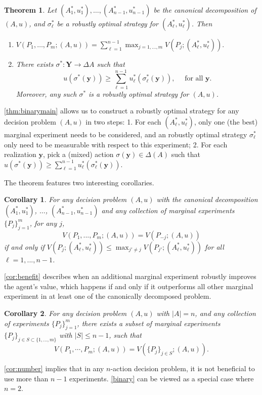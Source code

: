 \documentclass[11pt]{article}
\theoremstyle{plain}
\newtheorem{thm}{Theorem}
\newtheorem{cor}{Corollary}
\theoremstyle{remark}
\begin{document}
\begin{thm}\label{thm:binarymain}
Let $(A_1^*, u_1^*), \ldots , (A_{n-1}^*, u_{n-1}^*)$ be the canonical decomposition of $(A, u)$, and $\sigma^*_\ell$ be a robustly optimal strategy for $(A_{\ell}^*,u^*_\ell)$.   Then
\begin{enumerate}
    \item $V(P_1, \ldots , P_m; (A,u)) = \sum_{\ell = 1}^{n-1} \max_{j = 1, \ldots , m} V(P_j; (A_\ell^*, u_\ell^*)).$
    \item There exists $\sigma^*:\mathbf{Y}\rightarrow \Delta A$ such that
\[u(\sigma^*(\mathbf{y}))\geq \sum_{\ell=1}^{n-1} u^*_\ell(\sigma_\ell^*(\mathbf{y})),\quad\text{ for all }\mathbf{y}.\]
Moreover, any such $\sigma^*$ is a robustly optimal strategy for $(A,u)$.
\end{enumerate}
\end{thm}

\autoref{thm:binarymain} allows us to construct a robustly optimal strategy for any decision problem $(A,u)$ in two steps: 1. For each $(A^*_\ell,u^*_\ell)$, only one (the best) marginal experiment needs to be considered, and an robustly optimal strategy $\sigma^*_\ell$ only need to be measurable with respect to this experiment; 2. For each realization $\mathbf{y}$, pick a (mixed) action $\sigma(\mathbf{y})\in\Delta (A)$ such that $u(\sigma^*(\mathbf{y}))\geq \sum_{\ell=1}^{n-1} u^*_\ell(\sigma_\ell^*(\mathbf{y}))$.


The theorem features two interesting corollaries. 
\begin{cor}\label{cor:benefit}
For any decision problem $(A,u)$ with the canonical decomposition $(A_1^*,u_1^*)$, $\ldots$, $(A^*_{n-1},u^*_{n-1})$ and any collection of marginal experiments $\{P_j\}_{j=1}^m$, for any $j$,
\[V(P_1,...,P_m;(A,u))=V(P_{-j};(A,u))\]
if and only if $V(P_j;(A_\ell^*,u_\ell^*))\leq \max_{j'\neq j}V(P_{j'};(A_\ell^*,u_\ell^*))$ for all $\ell=1,...,n-1$.
\end{cor}
\autoref{cor:benefit} describes when an additional marginal experiment robustly improves the agent's value, which happens if and only if it outperforms all other marginal experiment in at least one of the canonically decomposed problem.

\begin{cor}\label{cor:number}
For any decision problem $(A,u)$ with $|A|=n$, and any collection of experiments $\{P_j\}_{j=1}^m$, there exists a subset of marginal experiments $\{P_j\}_{j\in S\subset \{1,...,m\}}$ with $|S|\leq n-1$, such that 
\[V(P_1,\cdots,P_m;(A,u))=V(\{P_j\}_{j\in S};(A,u)).\]
\end{cor}
\autoref{cor:number} implies that in any $n$-action decision problem, it is not beneficial to use more than $n-1$ experiments. \autoref{binary} can be viewed as a special case where $n=2$.
\end{document}
